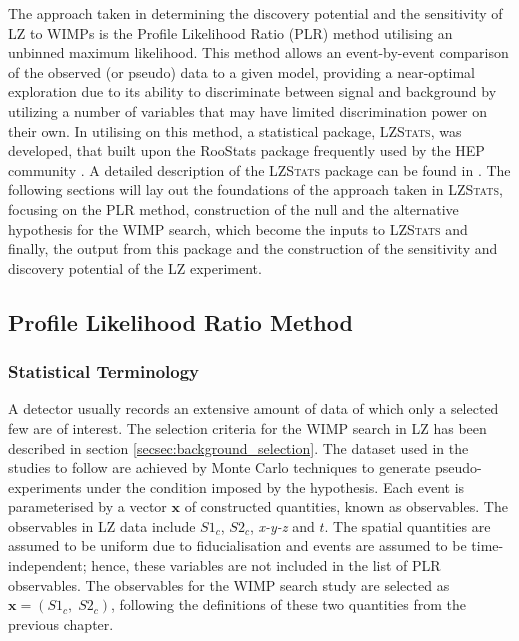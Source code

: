 The approach taken in determining the discovery potential and the sensitivity of LZ to WIMPs is the Profile Likelihood Ratio (PLR) method \cite{Rolke_2005} utilising an unbinned maximum likelihood. This method allows an event-by-event comparison of the observed (or pseudo) data to a given model, providing a near-optimal exploration due to its ability to discriminate between signal and background by utilizing a number of variables that may have limited discrimination power on their own. In utilising on this method, a statistical package, \textsc{LZStats}, was developed, that built upon the RooStats package frequently used by the HEP community \cite{moneta2010roostats}. A detailed description of the \textsc{LZStats} package can be found in \cite{ibles}. The following sections will lay out the foundations of the approach taken in \textsc{LZStats}, focusing on the PLR method, construction of the null and the alternative hypothesis for the WIMP search, which become the inputs to \textsc{LZStats} and finally, the output from this package and the construction of the sensitivity and discovery potential of the LZ experiment.


\subsection{Profile Likelihood Ratio Method}
\label{secsec:statistical_terminology}

\subsubsection{Statistical Terminology}

A detector usually records an extensive amount of data of which only a selected few are of interest. The selection criteria for the WIMP search in LZ has been described in section \ref{secsec:background_selection}. The dataset used in the studies to follow are achieved by Monte Carlo techniques to generate pseudo-experiments under the condition imposed by the hypothesis. Each event is parameterised by a vector $\pmb{x}$ of constructed quantities, known as observables. The observables in LZ data include $S1_{c}$, $S2_{c}$, \textit{x-y-z} and $t$. The spatial quantities are assumed to be uniform due to fiducialisation and events are assumed to be time-independent; hence, these variables are not included in the list of PLR observables. The observables for the WIMP search study are selected as $\pmb{x} = (S1_{c}, \; S2_{c})$, following the definitions of these two quantities from the previous chapter.

